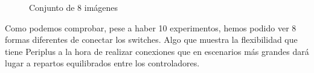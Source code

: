\documentclass[a4paper, 12pt]{book}
\begin{document}
\begin{figure}[H]
 	
 		\hfill
 		
 		\vspace{10pt} %
 		\hfill
 		
 		\caption{Conjunto de 8 imágenes}
 	\end{figure}
 	
 	Como podemos comprobar, pese a haber 10 experimentos, hemos podido ver 8 formas diferentes de conectar los switches. Algo que muestra la flexibilidad que tiene Periplus a la hora de realizar conexiones que en escenarios más grandes dará lugar a repartos equilibrados entre los controladores.
 	
\end{document}

